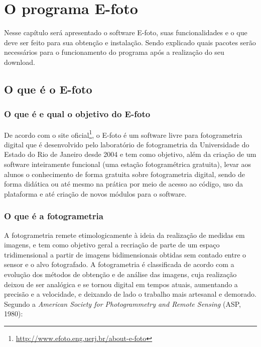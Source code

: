 \chapter{O programa E-foto}

Nesse capítulo será apresentado o software E-foto, suas funcionalidades e o que deve ser feito para sua obtenção e instalação. Sendo explicado quais pacotes serão necessários para o funcionamento do programa após a realização do seu download.

\section{O que é o E-foto}
\subsection{O que é e qual o objetivo do E-foto}
De acordo com o site oficial\footnote{\url{http://www.efoto.eng.uerj.br/about-e-foto}}, o E-foto é um software livre para fotogrametria digital que é desenvolvido pelo laboratório de fotogrametria da Universidade do Estado do Rio de Janeiro desde 2004 e tem como objetivo, além da criação de um software inteiramente funcional (uma estação fotogramétrica gratuita), levar aos alunos o conhecimento de forma gratuita sobre fotogrametria digital, sendo de forma didática ou até mesmo na prática por meio de acesso ao código, uso da plataforma e até criação de novos módulos para o software.

\subsection{O que é a fotogrametria}
A fotogrametria remete etimologicamente à ideia da realização de medidas em imagens, e tem como objetivo geral a recriação de parte de um espaço tridimensional a partir de imagens bidimensionais obtidas sem contado entre o sensor e o alvo fotografado. A fotogrametria é classificada de acordo com a evolução dos métodos de obtenção e de análise das imagens, cuja realização deixou de ser analógica e se tornou digital em tempos atuais, aumentando a precisão e a velocidade, e deixando de lado o trabalho mais artesanal e demorado.
Segundo a \textit{American Society for Photogrammetry and Remote Sensing} (ASP, 1980):


